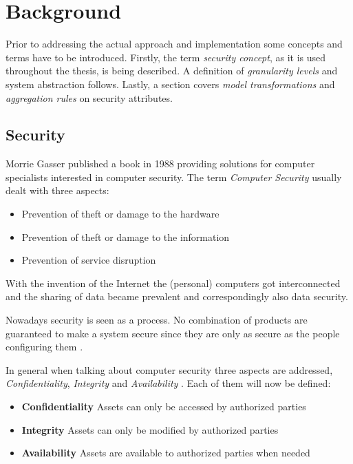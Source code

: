 
\newpage
\section{Background}

Prior to addressing the actual approach and implementation some concepts and terms have to be introduced. Firstly, the term \textit{security concept}, as it is used throughout the thesis, is being described. A definition of \textit{granularity levels} and system abstraction follows. Lastly, a section covers \textit{model transformations} and \textit{aggregation rules} on security attributes.

\subsection{Security}

Morrie Gasser \cite{Gasser} published a book in 1988 providing solutions for computer specialists interested in computer security. The term \textit{Computer Security} usually dealt with three aspects:

\begin{itemize}
\item Prevention of theft or damage to the hardware 
\item Prevention of theft or damage to the information
\item Prevention of service disruption
\end{itemize}

With the invention of the Internet the (personal) computers got interconnected and the sharing of data became prevalent and correspondingly also data security.

Nowadays security is seen as a process. No combination of products are guaranteed to make a system secure since they are only as secure as the people configuring them \cite{vacca2012computer}. \label{sec:security}

In general when talking about computer security three aspects are addressed, \textit{Confidentiality}, \textit{Integrity} and \textit{Availability} \cite{Pfleeger:2006:SC:1177321}. Each of them will now be defined:

\begin{itemize}
\item[] \textbf{Confidentiality} Assets can only be accessed by authorized parties
\item[] \textbf{Integrity} Assets can only be modified by authorized parties
\item[] \textbf{Availability} Assets are available to authorized parties when needed
\end{itemize} 

